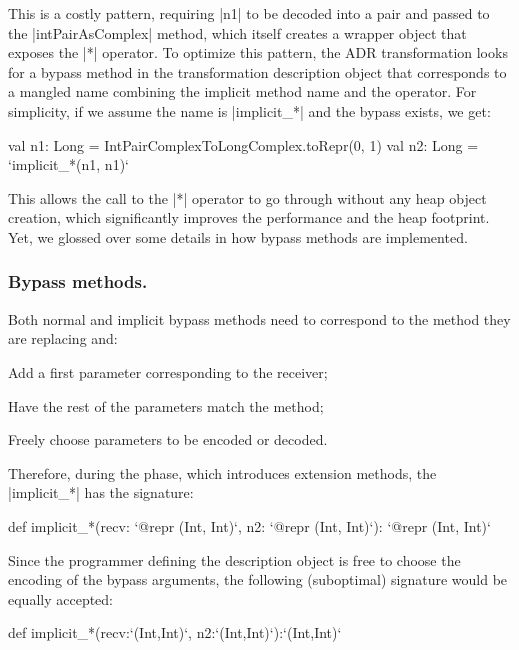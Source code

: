 This is a costly pattern, requiring |n1| to be decoded into a pair and passed to the |intPairAsComplex| method, which itself creates a wrapper object that exposes the |*| operator. To optimize this pattern, the ADR transformation looks for a bypass method in the transformation description object that corresponds to a mangled name combining the implicit method name and the operator. For simplicity, if we assume the name is |implicit_*| and the bypass exists, we get:

\begin{lstlisting-nobreak}
val n1: Long = IntPairComplexToLongComplex.toRepr(0, 1)
val n2: Long = `implicit_*(n1, n1)`
\end{lstlisting-nobreak}

This allows the call to the |*| operator to go through without any heap object creation, which significantly improves the performance and the heap footprint. Yet, we glossed over some details in how bypass methods are implemented.

\subsubsection{Bypass methods.} Both normal and implicit bypass methods need to correspond to the method they are replacing and:
\begin{compactitem}
\item Add a first parameter corresponding to the receiver;
\item Have the rest of the parameters match the method;
\item Freely choose parameters to be encoded or decoded.
\end{compactitem}

Therefore, during the \coerce{} phase, which introduces extension methods, the |implicit_*| has the signature:

\begin{lstlisting-nobreak}
def implicit_*(recv: `@repr (Int, Int)`,  n2: `@repr (Int, Int)`): `@repr (Int, Int)`
\end{lstlisting-nobreak}

Since the programmer defining the description object is free to choose the encoding of the bypass arguments, the following (suboptimal) signature would be equally accepted:

\begin{lstlisting-nobreak}
def implicit_*(recv:`(Int,Int)`, n2:`(Int,Int)`):`(Int,Int)`
\end{lstlisting-nobreak}

